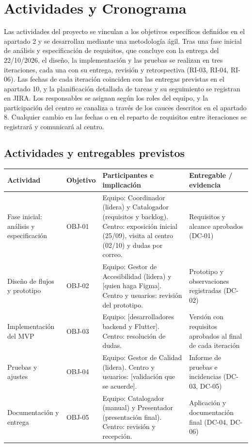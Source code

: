 
\newpage
\section{Actividades y Cronograma}

Las actividades del proyecto se vinculan a los objetivos específicos definidos en el apartado 2 y se desarrollan mediante una metodología ágil. Tras una fase inicial de análisis y especificación de requisitos, que concluye con la entrega del 22/10/2026, el diseño, la implementación y las pruebas se realizan en tres iteraciones, cada una con su entrega, revisión y retrospectiva (RI-03, RI-04, RI-06). Las fechas de cada iteración coinciden con las entregas previstas en el apartado 10, y la planificación detallada de tareas y su seguimiento se registran en JIRA. Los responsables se asignan según los roles del equipo, y la participación del centro se canaliza a través de los cauces descritos en el apartado 8. Cualquier cambio en las fechas o en el reparto de requisitos entre iteraciones se registrará y comunicará al centro.

\subsection{Actividades y entregables previstos}
\begin{center}
\small
\begin{tabularx}{\textwidth}{|>{\raggedright\arraybackslash}p{2.5cm}|>{\raggedright\arraybackslash}p{1.5cm}|>{\raggedright\arraybackslash}X|>{\raggedright\arraybackslash}p{3.4cm}|}
\hline
\rowcolor{tableHeader}
Actividad & Objetivo & Participantes e implicación & Entregable / evidencia \\
\hline
Fase inicial: análisis y especificación & OBJ-01 & Equipo: Coordinador (lidera) y Catalogador (requisitos y backlog). Centro: exposición inicial (25/09), visita al centro (02/10) y dudas por correo. & Requisitos y alcance aprobados (DC-01) \\
\hline
Diseño de flujos y prototipo & OBJ-02 & Equipo: Gestor de Accesibilidad (lidera) y [quien haga Figma]. Centro y usuarios: revisión del prototipo. & Prototipo y observaciones registradas (DC-02) \\
\hline
Implementación del MVP & OBJ-03 & Equipo: [desarrolladores backend y Flutter]. Centro: resolución de dudas. & Versión con requisitos aprobados al final de cada iteración \\
\hline
Pruebas y ajustes & OBJ-04 & Equipo: Gestor de Calidad (lidera). Centro y usuarios: [validación que se acuerde]. & Informe de pruebas e incidencias (DC-03, DC-05) \\
\hline
Documentación y entrega & OBJ-05 & Equipo: Catalogador (manual) y Presentador (presentación final). Centro: revisión y recepción. & Aplicación y documentación final (DC-04, DC-06) \\
\hline
\end{tabularx}
\end{center}


